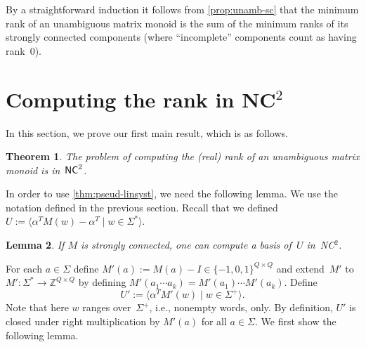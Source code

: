 \documentclass[11pt,a4paper]{amsart}
\newcommand{\NCT}{\textnormal{\textsf{NC$^2$}}\xspace}
\newcommand{\NC}{\textnormal{\textsf{NC}}\xspace}
\newcommand{\spn}[1]{\mathord{\langle #1 \rangle}}
\theoremstyle{plain}
\newtheorem{thm}{Theorem}[section]
\newtheorem{lem}[thm]{Lemma}
\theoremstyle{definition}
\theoremstyle{defC}
\theoremstyle{thmC}
\theoremstyle{plain}
\numberwithin{equation}{section}
\begin{document}
\noindent
By a straightforward induction it follows from \autoref{prop:unamb-sc} that the minimum rank of an unambiguous matrix monoid is the sum of the minimum ranks of its strongly connected components (where ``incomplete'' components count as having rank~$0$).



\section{Computing the rank in \texorpdfstring{\NCT}{NC2}}\label{sec-nc2}
In this section, we prove our first main result, which is as follows.


\begin{thm} \label{thm:rank-in-NC}
The problem of computing the (real) rank of an unambiguous matrix monoid is in~$\NC^2$.
\end{thm}


\noindent
In order to use \autoref{thm:pseud-linsyst}, we need the following lemma. We use the notation defined in the previous section.
Recall that we defined $U := \spn{\alpha^T M(w) - \alpha^T \mid w \in \Sigma^*}$.

\begin{lem} \label{lem:U-in-NC}
If $M$ is strongly connected,
one can compute a basis of~$U$ in~\NCT.
\end{lem}

\noindent
For each $a \in \Sigma$ define $M'(a) := M(a) - I \in \{-1,0,1\}^{Q \times Q}$ and extend~$M'$ to $M' : \Sigma^* \to \mathbb{Z}^{Q \times Q}$ by defining $M'(a_1 \cdots a_k) = M'(a_1) \cdots M'(a_k)$.
Define \[U' := \spn{\alpha^T M'(w) \mid w \in \Sigma^+}.\]
Note that here $w$ ranges over~$\Sigma^+$, i.e., nonempty words, only. By definition, $U'$ is closed under right multiplication by $M'(a)$ for all $a \in \Sigma$.
We first show the following lemma.
\end{document}
